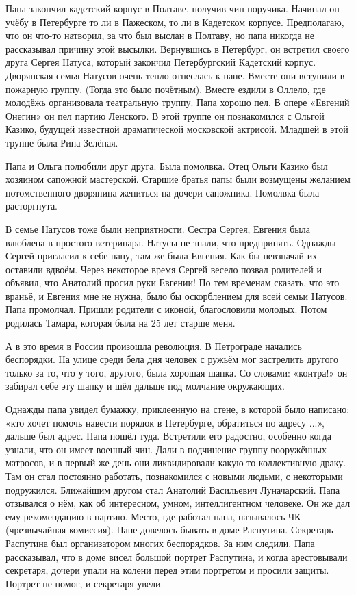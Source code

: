 Папа закончил кадетский корпус в Полтаве, получив чин поручика.
Начинал он учёбу в Петербурге то ли в Пажеском, то ли в Кадетском корпусе.
Предполагаю, что он что-то натворил, за что был выслан в Полтаву, но папа никогда не рассказывал причину этой высылки.
Вернувшись в Петербург, он встретил своего друга Сергея Натуса, который закончил Петербургский Кадетский корпус.
Дворянская семья Натусов очень тепло отнеслась к папе.
Вместе они вступили в пожарную группу.
(Тогда это было почётным).
Вместе ездили в Оллело, где молодёжь организовала театральную труппу.
Папа хорошо пел.
В опере «Евгений Онегин» он пел партию Ленского.
В этой труппе  он познакомился с Ольгой Казико, будущей известной драматической московской актрисой.
Младшей в этой труппе была Рина Зелёная.

Папа и Ольга полюбили друг друга.
Была помолвка.
Отец Ольги Казико был хозяином сапожной мастерской.
Старшие братья папы были возмущены желанием потомственного дворянина жениться на дочери сапожника.
Помолвка была расторгнута.

В семье Натусов тоже были неприятности.
Сестра Сергея, Евгения была влюблена в простого ветеринара.
Натусы не знали, что предпринять.
Однажды Сергей пригласил к себе папу, там же была Евгения.
Как бы невзначай их оставили вдвоём.
Через некоторое время Сергей весело позвал родителей и объявил, что Анатолий просил руки Евгении! По тем временам сказать, что это враньё, и Евгения мне не нужна, было бы оскорблением для всей семьи Натусов.
Папа промолчал.
Пришли родители с иконой, благословили молодых.
Потом родилась Тамара, которая была на 25 лет старше меня.

А в это время в России произошла революция.
В Петрограде начались беспорядки.
На улице среди бела дня человек с ружьём мог застрелить другого только за то, что у того, другого, была хорошая шапка.
Со словами: «контра!» он забирал себе эту шапку и шёл дальше под молчание окружающих.

Однажды папа увидел бумажку, приклеенную на стене, в которой было написано: «кто хочет помочь навести порядок в Петербурге, обратиться по адресу ...», дальше был адрес.
Папа пошёл туда.
Встретили его радостно, особенно когда узнали, что он имеет военный чин.
Дали в подчинение группу вооружённых матросов, и в первый же день они ликвидировали какую-то коллективную драку.
Там он стал постоянно работать, познакомился с новыми людьми, с некоторыми подружился.
Ближайшим другом стал Анатолий Васильевич Луначарский.
Папа отзывался о нём, как об интересном, умном, интеллигентном человеке.
Он же дал ему рекомендацию в партию.
Место, где работал папа, называлось ЧК (чрезвычайная комиссия).
Папе довелось бывать в доме Распутина.
Секретарь Распутина был организатором многих беспорядков.
За ним следили.
Папа рассказывал, что в доме висел большой портрет Распутина, и когда арестовывали секретаря, дочери упали на колени перед этим портретом и просили защиты.
Портрет не помог, и секретаря увели.

